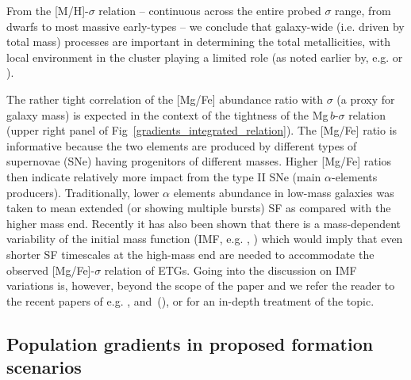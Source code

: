 \documentclass[useAMS,usenatbib]{mn2e}
\newcommand{\sig}{$\sigma$}
\newcommand{\mgb}{Mg\,$b$}
\begin{document}
From the [M/H]-{\sig} relation -- continuous across the entire probed {\sig} range, from dwarfs to most massive early-types -- we conclude that galaxy-wide (i.e. driven by total mass) processes are important in determining the total metallicities, with local environment in the cluster playing a limited role (as noted earlier by, e.g. \citealt{thomas:2010} or \citealt{rogers:2010}).

The rather tight correlation of the [Mg/Fe] abundance ratio with {\sig} (a proxy for galaxy mass) is expected in the context of the tightness of the {\mgb}-{\sig} relation (upper right panel of Fig~\ref{gradients_integrated_relation}). The [Mg/Fe] ratio is informative because the two elements are produced by different types of supernovae (SNe) having progenitors of different masses. Higher [Mg/Fe] ratios then indicate relatively more impact from the type II SNe (main $\alpha$-elements producers). Traditionally, lower $\alpha$ elements abundance in low-mass galaxies was taken to mean extended (or showing multiple bursts) SF as compared with the higher mass end. Recently it has also been shown that there is a mass-dependent variability of the initial mass function (IMF, e.g. \citealt{labarbera:2015}, \citealt{spiniello:2016}) which would imply that even shorter SF timescales at the high-mass end are needed to accommodate the observed [Mg/Fe]-{\sig} relation of ETGs. Going into the discussion on IMF variations is, however, beyond the scope of the paper and we refer the reader to the recent papers of e.g. \cite{smith:2014}, \cite{martinnavarro:2015} and~(\citeyear{martinnavarro:2016}), or \cite{labarbera:2015} for an in-depth treatment of the topic.

\subsection{Population gradients in proposed formation scenarios}
\end{document}
